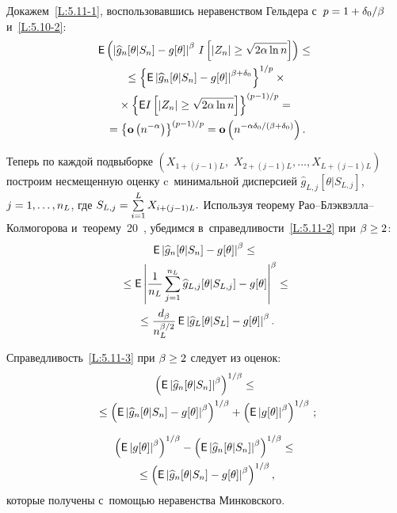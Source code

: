 \begin{multicols}{2}
 Докажем~\eqref{L:5.11-1}, воспользовавшись неравенством Гельдера с~$p\hm=1\hm+\delta_0/\beta$ и~\eqref{L:5.10-2}:
 \begin{multline*}
{\sf E} \left(\left|\widehat{g}_n[\theta|S_n]-g[\theta] \right|^{\beta}\,
 I\left[|Z_n|\ge \sqrt{2\alpha\ln n}\right]\right)\le{}
\\
{} \le
 \left\{{\sf E} \left|\widehat{g}_n[\theta|S_n]-g[\theta] \right|^{\beta+\delta_0}
 \right\}^{1/p}\times{}\\
 {}\times
 \left\{{\sf E} I\left[|Z_n|\ge \sqrt{2\alpha\ln n}\right]\right\}^{(p-1)/p}={}
\\
 {}= \left\{\mathbf{o}\left(n^{-\alpha}\right)\right\}^{(p-1)/p}=
 \mathbf{o}\left(n^{-\alpha\delta_0/(\beta+\delta_0)}\right).
 \end{multline*}

 Теперь по каждой подвыборке
 $\left(X_{1+(j-1)L},\right.$ $\left.X_{2+(j-1)L},\ldots,X_{L+(j-1)L}\right)$ построим несмещенную оценку c~минимальной дисперсией
 $\widehat{g}_{L,j}[\theta|S_{L,j}]$, $j\hm=1,\ldots,n_L$, где
 $S_{L,j}\hm=\sum\limits_{i=1}^L X_{i+(j-1)L}.$
 Используя теорему Рао--Блэк\-вэл\-ла--Кол\-мо\-го\-ро\-ва
 и~теорему~20~\cite[с.~89]{17-ch},
 убедимся в~справедливости~\eqref{L:5.11-2} при $\beta\hm\ge 2$:
 \begin{multline*}
{\sf E} \left|\widehat{g}_n[\theta|S_n]-g[\theta] \right|^{\beta}\le{}\\
{}\le
 {\sf E} \left|\displaystyle\frac{\displaystyle 1\mathstrut}{\displaystyle n_L\mathstrut} \sum\limits_{j=1}^{n_L} \widehat{g}_{L,j}[\theta|S_{L,j}]
 -g[\theta] \right|^{\beta}\le{}
\\
 {}\le
 \displaystyle\frac{\displaystyle d_\beta\mathstrut}{\displaystyle n_L^{\beta/2}\mathstrut} \,
 {\sf E} \left|\widehat{g}_L[\theta|S_L]-g[\theta] \right|^{\beta}.
 \end{multline*}

 Справедливость~\eqref{L:5.11-3} при $\beta\hm\ge 2$ следует из оценок:
  \begin{multline*}
  \left({\sf E} \left|\widehat{g}_n[\theta|S_n]\right|^{\beta}\right)^{1/\beta}\le{}\\
  {}\le
 \left({\sf E} \left|\widehat{g}_n[\theta|S_n]-g[\theta]\right|^{\beta}\right)^{1/\beta}+
 \left({\sf E} \left|g[\theta] \right|^{\beta}\right)^{1/\beta}\,;
\end{multline*}

\vspace*{-12pt}

\noindent
\begin{multline*}
 \left({\sf E} \left|g[\theta] \right|^{\beta}\right)^{1/\beta}-
 \left({\sf E} \left|\widehat{g}_n[\theta|S_n]\right|^{\beta}\right)^{1/\beta}\le{}\\
 {}\le
 \left({\sf E}\left|\widehat{g}_n[\theta|S_n]-g[\theta]\right|^{\beta}\right)^{1/\beta},
 \end{multline*}
 которые получены с~по\-мощью неравенства Минковского.


\end{multicols}
